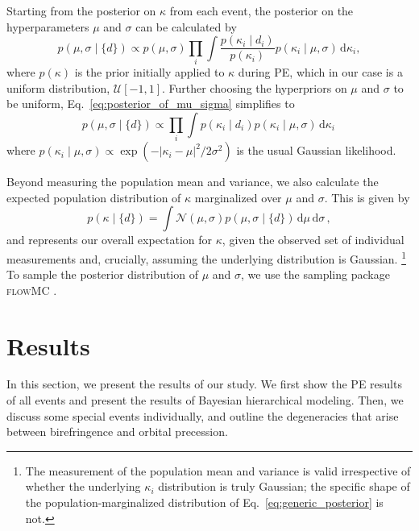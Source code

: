 \documentclass[aps,prd,twocolumn,superscriptaddress,preprintnumbers,floatfix,nofootinbib]{revtex4-2}
\newcommand{\infd}{\mathrm{d}}
\begin{document}
Starting from the posterior on $\kappa$ from each event, the posterior on the hyperparameters $\mu$ and $\sigma$ can be calculated by
\begin{equation}
    p(\mu,\sigma \mid \{d\})\propto p(\mu,\sigma)\prod_{i}\int\frac{p(\kappa_i\mid d_i)}{p(\kappa_i)}p(\kappa_i\mid\mu,\sigma)\,\infd\kappa_i,
    \label{eq:posterior_of_mu_sigma}
\end{equation}
where $p(\kappa)$ is the prior initially applied to $\kappa$ during \ac{PE}, which in our case is a uniform distribution, $\mathcal{U}[-1,1]$.
Further choosing the hyperpriors on $\mu$ and $\sigma$ to be uniform, Eq.~\eqref{eq:posterior_of_mu_sigma} simplifies to
\begin{equation}
    p(\mu,\sigma\mid\{d\})\propto\prod_{i}\int p(\kappa_i\mid d_i)p(\kappa_i\mid\mu,\sigma)\,\infd\kappa_i\,
\end{equation}
where $p(\kappa_i\mid\mu,\sigma) \propto \exp(-|\kappa_i - \mu|^2/2\sigma^2)$ is the usual Gaussian likelihood.

Beyond measuring the population mean and variance, we also calculate the expected population distribution of $\kappa$ marginalized over $\mu$ and $\sigma$.
This is given by
\begin{equation}
            p(\kappa\mid \{d\})=\int \mathcal{N}(\mu,\sigma)p(\mu,\sigma\mid \{d\})\,\infd\mu\,\infd\sigma\, , 
    \label{eq:generic_posterior}
\end{equation}
and represents our overall expectation for $\kappa$, given the observed set of individual measurements and, crucially, assuming the underlying distribution is Gaussian.%
\footnote{The measurement of the population mean and variance is valid irrespective of whether the underlying $\kappa_i$ distribution is truly Gaussian; the specific shape of the population-marginalized distribution of Eq.~\eqref{eq:generic_posterior} is not.}
To sample the posterior distribution of $\mu$ and $\sigma$, we use the sampling package \textsc{flowMC} \citep{flowMC}.

\section{Results}
\label{sec:Results}

In this section, we present the results of our study.
We first show the \ac{PE} results of all events and present the results of Bayesian hierarchical modeling.
Then, we discuss some special events individually, and outline the degeneracies that arise between birefringence and orbital precession.
\end{document}
